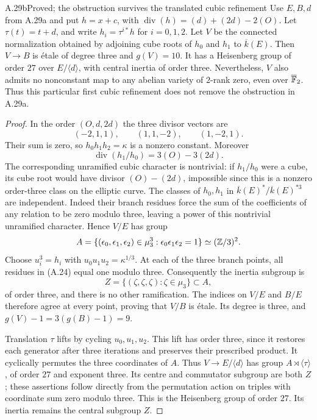 \begin{claim}{A.29b}{Proved; the obstruction survives the translated cubic refinement}
Use $E,B,d$ from A.29a and put $h=x+c$, with
$\operatorname{div}(h)=(d)+(2d)-2(O)$. Let
$\tau(t)=t+d$, and write $h_i=\tau^{i*}h$ for $i=0,1,2$.
Let $V$ be the connected normalization obtained by adjoining
cube roots of $h_0$ and $h_1$ to $\overline k(E)$.
Then $V\to B$ is \'etale of degree three and $g(V)=10$.
It has a Heisenberg group of order $27$ over $E/\langle d\rangle$,
with central inertia of order three. Nevertheless, $V$ also
admits no nonconstant map to any abelian variety of $2$-rank
zero, even over $\overline{\mathbb F}_2$. Thus this particular first
cubic refinement does not remove the obstruction in A.29a.
\end{claim}
\begin{proof}
In the order $(O,d,2d)$ the three divisor vectors are
\[
 (-2,1,1),\qquad(1,1,-2),\qquad(1,-2,1).                  \tag{A.24}
\]
Their sum is zero, so $h_0h_1h_2=\kappa$ is a nonzero
constant. Moreover
\[
 \operatorname{div}(h_1/h_0)=3(O)-3(2d).
\]
The corresponding unramified cubic character is nontrivial:
if $h_1/h_0$ were a cube, its cube root would have divisor
$(O)-(2d)$, impossible since this is a nonzero order-three
class on the elliptic curve. The classes of $h_0,h_1$ in
$\overline k(E)^*/\overline k(E)^{*3}$ are independent.
Indeed their branch residues force the sum of the coefficients
of any relation to be zero modulo three, leaving a power of
this nontrivial unramified character. Hence $V/E$ has group
\[
 A=\{(\epsilon_0,\epsilon_1,\epsilon_2)\in\mu_3^3:
                            \epsilon_0\epsilon_1\epsilon_2=1\}
                    \simeq(\mathbb Z/3)^2.
\]
Choose $u_i^3=h_i$ with
$u_0u_1u_2=\kappa^{1/3}$. At each of the three branch
points, all residues in (A.24) equal one modulo three.
Consequently the inertia subgroup is
\[
 Z=\{(\zeta,\zeta,\zeta):\zeta\in\mu_3\}\subset A,
\]
of order three, and there is no other ramification.
The indices on $V/E$ and $B/E$ therefore agree at every
point, proving that $V/B$ is \'etale. Its degree is three,
and $g(V)-1=3(g(B)-1)=9$.

Translation $\tau$ lifts by cycling $u_0,u_1,u_2$. This
lift has order three, since it restores each generator after
three iterations and preserves their prescribed product.
It cyclically permutes the three coordinates of $A$.
Thus $V\to E/\langle d\rangle$ has group
$A\rtimes\langle\tau\rangle$, of order $27$ and exponent
three. Its centre and commutator subgroup are both $Z$;
these assertions follow directly from the permutation action
on triples with coordinate sum zero modulo three. This is
the Heisenberg group of order $27$. Its inertia remains the
central subgroup $Z$.


\end{proof}
